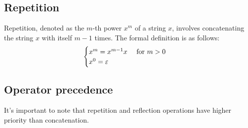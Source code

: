\subsection*{Repetition}
Repetition, denoted as the $m$-th power $x^m$ of a string $x$, involves concatenating the string $x$ with itself $m-1$ times. 
The formal definition is as follows:
\[
\begin{cases}
    x^m=x^{m-1}x \:\:\:\:\:\: \textnormal{for } m > 0 \\
    x^0=\varepsilon
\end{cases}
\]

\subsection*{Operator precedence}
It's important to note that repetition and reflection operations have higher priority than concatenation.